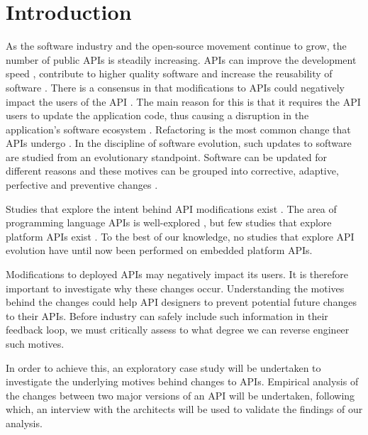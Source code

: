 \documentclass{sig-alternate}
\begin{document}
\section{Introduction} \label{introduction}
As the software industry and the open-source movement continue to grow, the number of public APIs is steadily increasing. APIs can improve the development speed \cite{stylos2006comparing}, contribute to higher quality software \cite{stylos2006comparing} and increase the reusability of software \cite{afonso2012evaluating}. There is a consensus in that modifications to APIs could negatively impact the users of the API \cite{google_talk, mcdonnell2013empirical, robbes2012developers, henning2007api}. The main reason for this is that it requires the API users to update the application code, thus causing a disruption in the application's software ecosystem \cite{messerschmitt2005software}. Refactoring is the most common change that APIs undergo \cite{dig2005role, xing2006refactoring}. 
In the discipline of software evolution, such updates to software are studied from an evolutionary standpoint. Software can be updated for different reasons and these motives can be grouped into corrective, adaptive, perfective and preventive changes \cite{lientz1980software}. 

Studies that explore the intent behind API modifications exist \cite{hou2011exploring}. The area of programming language APIs is well-explored \cite{hou2011exploring, shi2011empirical}, but few studies that explore platform APIs exist \cite{robbes2012developers}. To the best of our knowledge, no studies that explore API evolution have until now been performed on embedded platform APIs. 


Modifications to deployed APIs may negatively impact its users. It is therefore important to investigate why these changes occur. Understanding the motives behind the changes could help API designers to  prevent potential future changes to their APIs. Before industry can safely include such information in their feedback loop, we must critically assess to what degree we can reverse engineer such motives. 

In order to achieve this, an exploratory case study will be undertaken to investigate the underlying motives behind changes to APIs. Empirical analysis of the changes between two major versions of an API will be undertaken, following which, an interview with the architects will be used to validate the findings of our analysis. 
\end{document}

